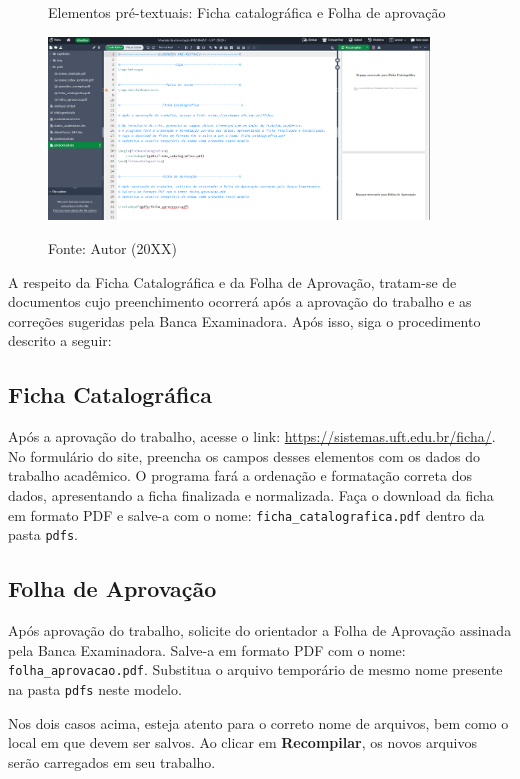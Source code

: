 \begin{apendicesenv}
\begin{figure}[H]
    \centering
    \caption{Elementos pré-textuais: Ficha catalográfica e Folha de aprovação}
    \includegraphics[width=0.9\textwidth]{img/modelo/pretextual-01.png}
    \\
    \caption*{\small{Fonte: Autor (20XX)}}
    \label{fig:pretextual-01}
\end{figure}

A respeito da Ficha Catalográfica e da Folha de Aprovação, tratam-se de documentos cujo preenchimento ocorrerá após a aprovação do trabalho e as correções sugeridas pela Banca Examinadora. Após isso, siga o procedimento descrito a seguir:

\subsection*{Ficha Catalográfica}
Após a aprovação do trabalho, acesse o link: \url{https://sistemas.uft.edu.br/ficha/}. No formulário do site, preencha os campos desses elementos com os dados do trabalho acadêmico.  O programa fará a ordenação e formatação correta dos dados, apresentando a ficha finalizada e normalizada. Faça o download da ficha em formato PDF e salve-a com o nome: \verb|ficha_catalografica.pdf| dentro da pasta \verb|pdfs|. 

\subsection*{Folha de Aprovação}

Após aprovação do trabalho, solicite do orientador a Folha de Aprovação assinada pela Banca Examinadora. Salve-a em formato PDF com o nome: \verb|folha_aprovacao.pdf|. Substitua o arquivo temporário de mesmo nome presente na pasta \verb|pdfs| neste modelo.


Nos dois casos acima, esteja atento para o correto nome de arquivos, bem como o local em que devem ser salvos. Ao clicar em \textbf{Recompilar}, os novos arquivos serão carregados em seu trabalho.


\end{apendicesenv}
